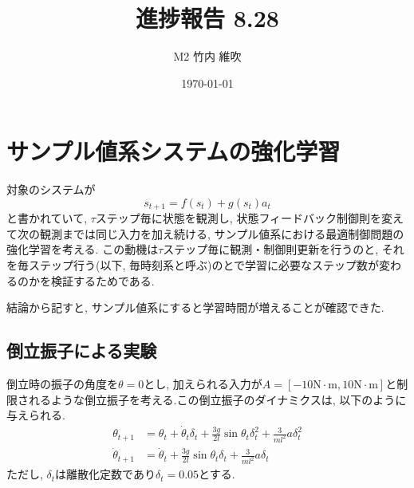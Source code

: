 \documentclass{jsarticle}
\title{\large{\bf{進捗報告 8.28}}}
\author{M2 竹内 維吹}
\date{\today}
\begin{document}
\maketitle


\section{サンプル値系システムの強化学習}
対象のシステムが
\begin{equation}
	s_{t+1} = f(s_t) + g(s_t)a_t
\end{equation}
と書かれていて,  $\tau$ステップ毎に状態を観測し, 状態フィードバック制御則を変えて次の観測までは同じ入力を加え続ける, サンプル値系における最適制御問題の強化学習を考える. この動機は$\tau$ステップ毎に観測・制御則更新を行うのと, それを毎ステップ行う(以下, 毎時刻系と呼ぶ)のとで学習に必要なステップ数が変わるのかを検証するためである.\par
結論から記すと, サンプル値系にすると学習時間が増えることが確認できた. 

\subsection{倒立振子による実験}
倒立時の振子の角度を$\theta=0$とし, 加えられる入力が$A=[-10\textrm{N}\cdot\textrm{m},10\textrm{N}\cdot\textrm{m}]$と制限されるような倒立振子を考える.この倒立振子のダイナミクスは, 以下のように与えられる.
\begin{align}
	\theta_{t+1} &= \theta_t+\dot{\theta}_t\delta_t+\frac{3g}{2l}\sin{\theta_t}\delta_t^2+\frac{3}{ml^2}a\delta_t^2 \\
	\dot{\theta}_{t+1} &=  \dot{\theta}_t+\frac{3g}{2l}\sin{\theta_t}\delta_t+\frac{3}{ml^2}a\delta_t
\end{align}
ただし, $\delta_t$は離散化定数であり$\delta_t=0.05$とする.\par
\end{document}
